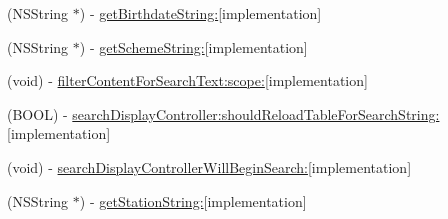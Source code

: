 \begin{DoxyCompactItemize}
(N\+S\+String $\ast$) -\/ \hyperlink{interface_medikamente_view_controller_a498ace480a3e2d37a9ee68034bc34544}{get\+Birthdate\+String\+:}{\ttfamily  \mbox{[}implementation\mbox{]}}
\item 
(N\+S\+String $\ast$) -\/ \hyperlink{interface_medikamente_view_controller_aeb24ed821b5a6a79e7e1aabf03bed6c2}{get\+Scheme\+String\+:}{\ttfamily  \mbox{[}implementation\mbox{]}}
\item 
(void) -\/ \hyperlink{interface_medikamente_view_controller_a7a058f11f9c4b84e4d14953ff8a4fc3e}{filter\+Content\+For\+Search\+Text\+:scope\+:}{\ttfamily  \mbox{[}implementation\mbox{]}}
\item 
(B\+O\+O\+L) -\/ \hyperlink{interface_medikamente_view_controller_a59e8340f03a3551ceff7a33e2bce3649}{search\+Display\+Controller\+:should\+Reload\+Table\+For\+Search\+String\+:}{\ttfamily  \mbox{[}implementation\mbox{]}}
\item 
(void) -\/ \hyperlink{interface_medikamente_view_controller_a84753188124dfa16d816d17b3f24b2fd}{search\+Display\+Controller\+Will\+Begin\+Search\+:}{\ttfamily  \mbox{[}implementation\mbox{]}}
\item 
(N\+S\+String $\ast$) -\/ \hyperlink{interface_medikamente_view_controller_ae39827760247c1a1b90a1d32324a0b09}{get\+Station\+String\+:}{\ttfamily  \mbox{[}implementation\mbox{]}}
\end{DoxyCompactItemize}
